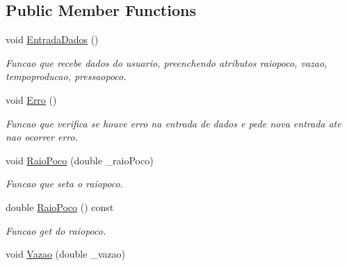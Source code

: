 \subsection*{Public Member Functions}
\begin{DoxyCompactItemize}
\item 
\hypertarget{classCPoco_aa1e23aefdb4a4efbc4cef7a5d5306f2c}{void \hyperlink{classCPoco_aa1e23aefdb4a4efbc4cef7a5d5306f2c}{Entrada\-Dados} ()}\label{classCPoco_aa1e23aefdb4a4efbc4cef7a5d5306f2c}

\begin{DoxyCompactList}\small\item\em Funcao que recebe dados do usuario, preenchendo atributos raiopoco, vazao, tempoproducao, pressaopoco. \end{DoxyCompactList}\item 
\hypertarget{classCPoco_a5de538de21fc145866380e35bd9f484a}{void \hyperlink{classCPoco_a5de538de21fc145866380e35bd9f484a}{Erro} ()}\label{classCPoco_a5de538de21fc145866380e35bd9f484a}

\begin{DoxyCompactList}\small\item\em Funcao que verifica se houve erro na entrada de dados e pede nova entrada ate nao ocorrer erro. \end{DoxyCompactList}\item 
\hypertarget{classCPoco_a19879337015fdec5dcfc5aec710244e1}{void \hyperlink{classCPoco_a19879337015fdec5dcfc5aec710244e1}{Raio\-Poco} (double \-\_\-raio\-Poco)}\label{classCPoco_a19879337015fdec5dcfc5aec710244e1}

\begin{DoxyCompactList}\small\item\em Funcao que seta o raiopoco. \end{DoxyCompactList}\item 
\hypertarget{classCPoco_ad773ade15b096fde9b369f2199acfca1}{double \hyperlink{classCPoco_ad773ade15b096fde9b369f2199acfca1}{Raio\-Poco} () const }\label{classCPoco_ad773ade15b096fde9b369f2199acfca1}

\begin{DoxyCompactList}\small\item\em Funcao get do raiopoco. \end{DoxyCompactList}\item 
\hypertarget{classCPoco_a5d957a20d22b97515c726862a2b5e870}{void \hyperlink{classCPoco_a5d957a20d22b97515c726862a2b5e870}{Vazao} (double \-\_\-vazao)}\label{classCPoco_a5d957a20d22b97515c726862a2b5e870}


\end{DoxyCompactItemize}
